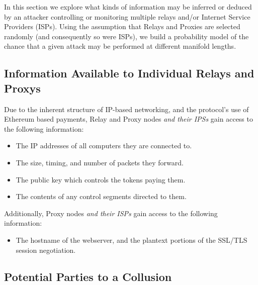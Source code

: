

In this section we explore what kinds of information may be inferred
or deduced by an attacker controlling or monitoring multiple relays
and/or Internet Service Providers (ISPs). Using the assumption that
Relays and Proxies are selected randomly (and consequently so were
ISPs), we build a probability model of the chance that a given attack
may be performed at different manifold lengths.

\subsection{Information Available to Individual Relays and Proxys}
\label{relay-proxy-info-known}

Due to the inherent structure of IP-based networking, and the
\Orchid{} protocol's use of Ethereum based payments, Relay and Proxy
nodes \emph{and their IPSs} gain access to the following information:

\begin{itemize}
\item The IP addresses of all computers they are connected to.
\item The size, timing, and number of packets they forward.
\item The public key which controls the tokens paying them.
\item The contents of any control segments directed to them.
\end{itemize}

Additionally, Proxy nodes \emph{and their ISPs} gain access to the
following information:

\begin{itemize}
\item The hostname of the webserver, and the plantext portions of the
  SSL/TLS session negotiation.
\end{itemize}

\subsection{Potential Parties to a Collusion}
\label{sec:collusion}

